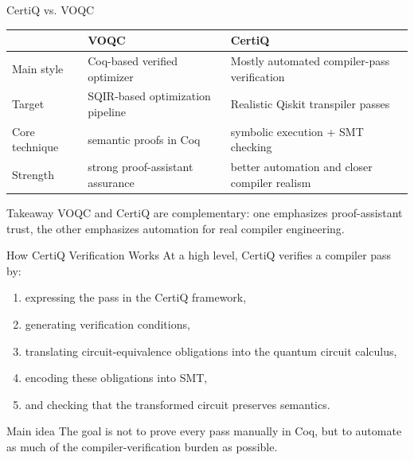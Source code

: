 \documentclass[aspectratio=169]{beamer}
\begin{document}
\begin{frame}{CertiQ vs. VOQC}
\centering
\renewcommand{\arraystretch}{1.35}
\begin{tabular}{>{\raggedright\arraybackslash}p{3.2cm} >{\raggedright\arraybackslash}p{3.7cm} >{\raggedright\arraybackslash}p{3.7cm}}
\toprule
 & \textbf{VOQC} & \textbf{CertiQ} \\
\midrule
Main style & Coq-based verified optimizer & Mostly automated compiler-pass verification \\
Target & SQIR-based optimization pipeline & Realistic Qiskit transpiler passes \\
Core technique & semantic proofs in Coq & symbolic execution + SMT checking \\
Strength & strong proof-assistant assurance & better automation and closer compiler realism \\
\bottomrule
\end{tabular}

\vspace{0.8em}
\begin{block}{Takeaway}
VOQC and CertiQ are complementary:
one emphasizes proof-assistant trust, the other emphasizes automation for real compiler engineering.
\end{block}
\end{frame}
\begin{frame}{How CertiQ Verification Works}
\justifying
At a high level, CertiQ verifies a compiler pass by:

\vspace{0.6em}
\begin{enumerate}
    \item expressing the pass in the CertiQ framework,
    \item generating verification conditions,
    \item translating circuit-equivalence obligations into the quantum circuit calculus,
    \item encoding these obligations into SMT,
    \item and checking that the transformed circuit preserves semantics.
\end{enumerate}

\vspace{0.8em}
\begin{block}{Main idea}
The goal is not to prove every pass manually in Coq,
but to automate as much of the compiler-verification burden as possible.
\end{block}
\end{frame}
\end{document}
